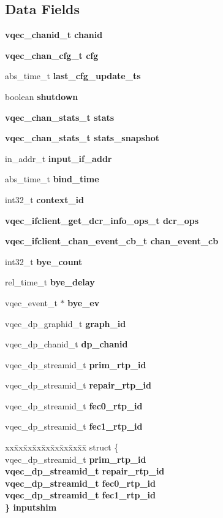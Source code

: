 \subsection*{Data Fields}
\begin{CompactItemize}
\item 
\bf{vqec\_\-chanid\_\-t} \bf{chanid}
\item 
\bf{vqec\_\-chan\_\-cfg\_\-t} \bf{cfg}
\item 
abs\_\-time\_\-t \bf{last\_\-cfg\_\-update\_\-ts}
\item 
boolean \bf{shutdown}
\item 
\bf{vqec\_\-chan\_\-stats\_\-t} \bf{stats}
\item 
\bf{vqec\_\-chan\_\-stats\_\-t} \bf{stats\_\-snapshot}
\item 
in\_\-addr\_\-t \bf{input\_\-if\_\-addr}
\item 
abs\_\-time\_\-t \bf{bind\_\-time}
\item 
int32\_\-t \bf{context\_\-id}
\item 
\bf{vqec\_\-ifclient\_\-get\_\-dcr\_\-info\_\-ops\_\-t} \bf{dcr\_\-ops}
\item 
\bf{vqec\_\-ifclient\_\-chan\_\-event\_\-cb\_\-t} \bf{chan\_\-event\_\-cb}
\item 
int32\_\-t \bf{bye\_\-count}
\item 
rel\_\-time\_\-t \bf{bye\_\-delay}
\item 
vqec\_\-event\_\-t $\ast$ \bf{bye\_\-ev}
\item 
vqec\_\-dp\_\-graphid\_\-t \bf{graph\_\-id}
\item 
vqec\_\-dp\_\-chanid\_\-t \bf{dp\_\-chanid}
\item 
vqec\_\-dp\_\-streamid\_\-t \bf{prim\_\-rtp\_\-id}
\item 
vqec\_\-dp\_\-streamid\_\-t \bf{repair\_\-rtp\_\-id}
\item 
vqec\_\-dp\_\-streamid\_\-t \bf{fec0\_\-rtp\_\-id}
\item 
vqec\_\-dp\_\-streamid\_\-t \bf{fec1\_\-rtp\_\-id}
\item 
\begin{tabbing}
xx\=xx\=xx\=xx\=xx\=xx\=xx\=xx\=xx\=\kill
struct \{\\
\>vqec\_dp\_streamid\_t \bf{prim\_rtp\_id}\\
\>vqec\_dp\_streamid\_t \bf{repair\_rtp\_id}\\
\>vqec\_dp\_streamid\_t \bf{fec0\_rtp\_id}\\
\>vqec\_dp\_streamid\_t \bf{fec1\_rtp\_id}\\
\} \bf{inputshim}\\


\end{tabbing}
\end{CompactItemize}
